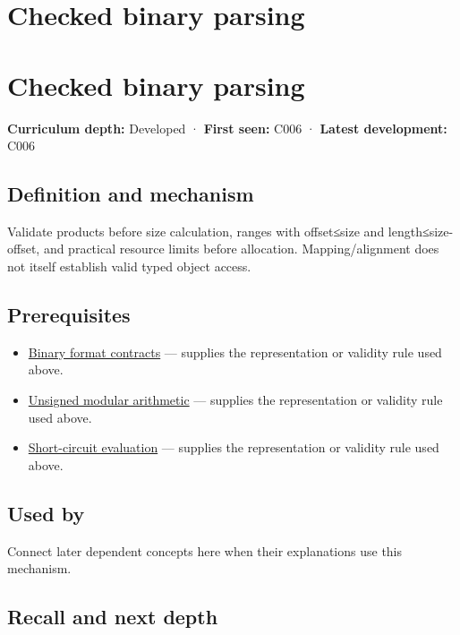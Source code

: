 \hypertarget{appendix-652d81568de9}{}
\section*{Checked binary parsing}
\section{Checked binary parsing}\label{checked-binary-parsing}

\textbf{Curriculum depth:} Developed · \textbf{First seen:} C006 · \textbf{Latest development:} C006

\subsection{Definition and mechanism}\label{definition-and-mechanism}

Validate products before size calculation, ranges with offset≤size and length≤size-offset, and practical resource limits before allocation. Mapping/alignment does not itself establish valid typed object access.

\subsection{Prerequisites}\label{prerequisites}

\begin{itemize}
\tightlist
\item
  \hyperref[appendix-590bbb2424c1]{Binary format contracts} --- supplies the representation or validity rule used above.
\item
  \hyperref[appendix-c99977d88b33]{Unsigned modular arithmetic} --- supplies the representation or validity rule used above.
\item
  \hyperref[appendix-2e245a6fa8d3]{Short-circuit evaluation} --- supplies the representation or validity rule used above.
\end{itemize}

\subsection{Used by}\label{used-by}

Connect later dependent concepts here when their explanations use this mechanism.

\subsection{Recall and next depth}\label{recall-and-next-depth}

